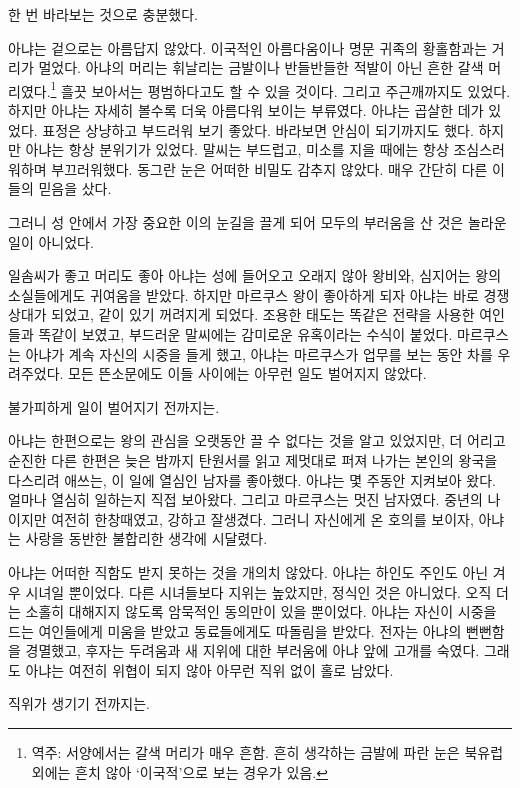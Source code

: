 한 번 바라보는 것으로 충분했다.

아냐는 겉으로는 아름답지 않았다. 이국적인 아름다움이나 명문 귀족의 황홀함과는 거리가 멀었다. 아냐의 머리는 휘날리는 금발이나 반들반들한 적발이 아닌 흔한 갈색 머리였다.\footnote{역주: 서양에서는 갈색 머리가 매우 흔함. 흔히 생각하는 금발에 파란 눈은 북유럽 외에는 흔치 않아 `이국적'으로 보는 경우가 있음.} 흘끗 보아서는 평범하다고도 할 수 있을 것이다. 그리고 주근깨까지도 있었다. 하지만 아냐는 자세히 볼수록 더욱 아름다워 보이는 부류였다. 아냐는 곱살한 데가 있었다. 표정은 상냥하고 부드러워 보기 좋았다. 바라보면 안심이 되기까지도 했다. 하지만 아냐는 항상 분위기가 있었다. 말씨는 부드럽고, 미소를 지을 때에는 항상 조심스러워하며 부끄러워했다. 동그란 눈은 어떠한 비밀도 감추지 않았다. 매우 간단히 다른 이들의 믿음을 샀다.

그러니 성 안에서 가장 중요한 이의 눈길을 끌게 되어 모두의 부러움을 산 것은 놀라운 일이 아니었다.

일솜씨가 좋고 머리도 좋아 아냐는 성에 들어오고 오래지 않아 왕비와, 심지어는 왕의 소실들에게도 귀여움을 받았다. 하지만 마르쿠스 왕이 좋아하게 되자 아냐는 바로 경쟁 상대가 되었고, 같이 있기 꺼려지게 되었다. 조용한 태도는 똑같은 전략을 사용한 여인들과 똑같이 보였고, 부드러운 말씨에는 감미로운 유혹이라는 수식이 붙었다. 마르쿠스는 아냐가 계속 자신의 시중을 들게 했고, 아냐는 마르쿠스가 업무를 보는 동안 차를 우려주었다. 모든 뜬소문에도 이들 사이에는 아무런 일도 벌어지지 않았다.

불가피하게 일이 벌어지기 전까지는.

아냐는 한편으로는 왕의 관심을 오랫동안 끌 수 없다는 것을 알고 있었지만, 더 어리고 순진한 다른 한편은 늦은 밤까지 탄원서를 읽고 제멋대로 퍼져 나가는 본인의 왕국을 다스리려 애쓰는, 이 일에 열심인 남자를 좋아했다. 아냐는 몇 주동안 지켜보아 왔다. 얼마나 열심히 일하는지 직접 보아왔다. 그리고 마르쿠스는 멋진 남자였다. 중년의 나이지만 여전히 한창때였고, 강하고 잘생겼다. 그러니 자신에게 온 호의를 보이자, 아냐는 사랑을 동반한 불합리한 생각에 시달렸다.

아냐는 어떠한 직함도 받지 못하는 것을 개의치 않았다. 아냐는 하인도 주인도 아닌 겨우 시녀일 뿐이었다. 다른 시녀들보다 지위는 높았지만, 정식인 것은 아니었다. 오직 더는 소홀히 대해지지 않도록 암묵적인 동의만이 있을 뿐이었다. 아냐는 자신이 시중을 드는 여인들에게 미움을 받았고 동료들에게도 따돌림을 받았다. 전자는 아냐의 뻔뻔함을 경멸했고, 후자는 두려움과 새 지위에 대한 부러움에 아냐 앞에 고개를 숙였다. 그래도 아냐는 여전히 위협이 되지 않아 아무런 직위 없이 홀로 남았다.

직위가 생기기 전까지는.

